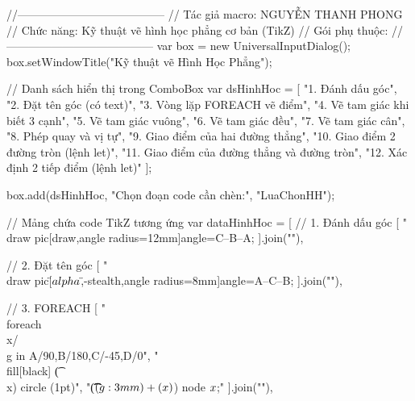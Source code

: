 //---------------------------------------
// Tác giả macro: NGUYỄN THANH PHONG
// Chức năng: Kỹ thuật vẽ hình học phẳng cơ bản (TikZ)
// Gói phụ thuộc: \usetikzlibrary{calc, intersections, angles, quotes}
//---------------------------------------
var box = new UniversalInputDialog();
box.setWindowTitle("Kỹ thuật vẽ Hình Học Phẳng");

// Danh sách hiển thị trong ComboBox
var dsHinhHoc = [
"1. Đánh dấu góc",
"2. Đặt tên góc (có text)",
"3. Vòng lặp FOREACH vẽ điểm",
"4. Vẽ tam giác khi biết 3 cạnh",
"5. Vẽ tam giác vuông",
"6. Vẽ tam giác đều",
"7. Vẽ tam giác cân",
"8. Phép quay và vị tự",
"9. Giao điểm của hai đường thẳng",
"10. Giao điểm 2 đường tròn (lệnh let)",
"11. Giao điểm của đường thẳng và đường tròn",
"12. Xác định 2 tiếp điểm (lệnh let)"
];

box.add(dsHinhHoc, "Chọn đoạn code cần chèn:", "LuaChonHH");

// Mảng chứa code TikZ tương ứng
var dataHinhHoc = [
// 1. Đánh dấu góc
[
"\t\\draw pic[draw,angle radius=12mm]{angle=C--B--A}; %
].join("\n"),

// 2. Đặt tên góc
[
"\t\\draw pic[\"$\\alpha$\",-stealth,angle radius=8mm]{angle=A--C--B}; %
].join("\n"),

// 3. FOREACH
[
"\t\\foreach \\x/\\g in {A/90,B/180,C/-45,D/0}",
"\t\t\t\\fill[black] \t(\\x) circle (1pt)",
"\t\t\t($(\\g:3mm)+(\\x)$) node {$\\x$};"
].join("\n"),


